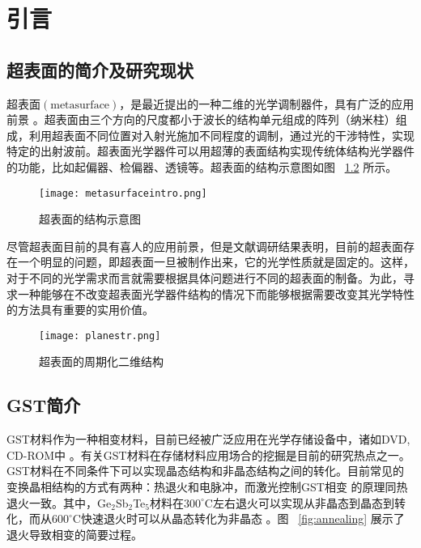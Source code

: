 \chapter{引言}
\label{cha:intro}

\section{超表面的简介及研究现状}
超表面$\left ( \textrm{metasurface} \right )$，是最近提出的一种二维的光学调制器件，具有广泛的应用前景 \cite{intro02}。超表面由三个方向的尺度都小于波长的结构单元组成的阵列（纳米柱）组成，利用超表面不同位置对入射光施加不同程度的调制，通过光的干涉特性，实现特定的出射波前\cite{intro01}。超表面光学器件可以用超薄的表面结构实现传统体结构光学器件的功能，比如起偏器、检偏器、透镜等。超表面的结构示意图如图 ~\ref{fig:c1fig1} \cite{structure} 所示。
\begin{figure}[H] %
  \centering
  \texttt{[image: metasurfaceintro.png]}
  \caption{超表面的结构示意图}  \cite{intro01}
  \label{fig:c1fig1}
\end{figure}

尽管超表面目前的具有喜人的应用前景，但是文献调研结果表明，目前的超表面存在一个明显的问题，即超表面一旦被制作出来，它的光学性质就是固定的。这样，对于不同的光学需求而言就需要根据具体问题进行不同的超表面的制备。为此，寻求一种能够在不改变超表面光学器件结构的情况下而能够根据需要改变其光学特性的方法具有重要的实用价值。

\begin{figure}[H] %
  \centering
  \texttt{[image: planestr.png]}
  \caption{超表面的周期化二维结构}
  \label{fig:c1fig1}
\end{figure}


\section{GST简介}
\label{sec:first}

GST材料作为一种相变材料，目前已经被广泛应用在光学存储设备中，诸如DVD, CD-ROM中 \cite{savemedia} \cite{tbt}。有关GST材料在存储材料应用场合的挖掘是目前的研究热点之一。GST材料在不同条件下可以实现晶态结构和非晶态结构之间的转化。目前常见的变换晶相结构的方式有两种：热退火和电脉冲，而激光控制GST相变 \cite{laser} 的原理同热退火一致。其中，Ge$_{2}$Sb$_{2}$Te$_{5}$材料在$300 ^{\circ}$C左右退火可以实现从非晶态到晶态到转化，而从$600^{\circ}$C快速退火时可以从晶态转化为非晶态 \cite{GSTbase} 。图 ~\ref{fig:annealing} 展示了退火导致相变的简要过程。

